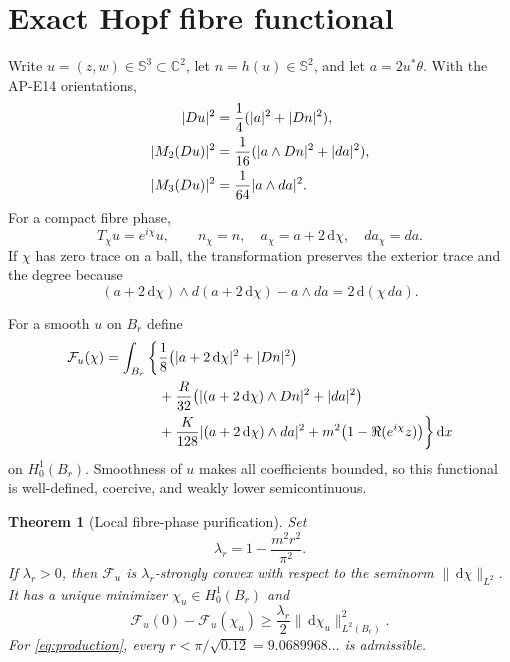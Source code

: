 \documentclass[11pt]{article}
\newtheorem{theorem}{Theorem}[section]
\newcommand{\dd}{\,\mathrm d}
\newcommand{\SSS}{\mathbb S}
\begin{document}
\section{Exact Hopf fibre functional}

Write $u=(z,w)\in\SSS^3\subset\mathbb C^2$, let $n=h(u)\in\SSS^2$, and let
$a=2u^*\theta$.  With the AP-E14 orientations,
\begin{align}
 |Du|^2&=\frac14(|a|^2+|Dn|^2),\notag\\
 |M_2(Du)|^2&=\frac1{16}(|a\wedge Dn|^2+|da|^2),\notag\\
 |M_3(Du)|^2&=\frac1{64}|a\wedge da|^2.              \label{eq:hopf}
\end{align}
For a compact fibre phase,
\begin{equation}
 T_\chi u=e^{i\chi}u,\qquad
 n_\chi=n,\quad a_\chi=a+2\dd\chi,\quad da_\chi=da.
 \label{eq:phase}
\end{equation}
If $\chi$ has zero trace on a ball, the transformation preserves the
exterior trace and the degree because
\begin{equation}
 (a+2\dd\chi)\wedge d(a+2\dd\chi)-a\wedge da
 =2\dd(\chi\,da).
 \label{eq:degree-invariance}
\end{equation}

For a smooth $u$ on $B_r$ define
\begin{align}
 \mathcal F_u(\chi)
 =\int_{B_r}\bigg\{&
 \frac18\bigl(|a+2\dd\chi|^2+|Dn|^2\bigr)\notag\\
 &+\frac R{32}\bigl(|(a+2\dd\chi)\wedge Dn|^2+|da|^2\bigr)\notag\\
 &+\frac K{128}|(a+2\dd\chi)\wedge da|^2
 +m^2\bigl(1-\Re(e^{i\chi}z)\bigr)\bigg\}\dd x
 \label{eq:phase-functional}
\end{align}
on $H^1_0(B_r)$.  Smoothness of $u$ makes all coefficients bounded, so this
functional is well-defined, coercive, and weakly lower semicontinuous.

\begin{theorem}[Local fibre-phase purification]
Set
\begin{equation}
 \lambda_r=1-\frac{m^2r^2}{\pi^2}.
 \label{eq:lambda}
\end{equation}
If $\lambda_r>0$, then $\mathcal F_u$ is
$\lambda_r$-strongly convex with respect to the seminorm
$\|\dd\chi\|_{L^2}$.  It has a unique minimizer $\chi_u\in H^1_0(B_r)$ and
\begin{equation}
 \mathcal F_u(0)-\mathcal F_u(\chi_u)
 \geq\frac{\lambda_r}{2}\|\dd\chi_u\|_{L^2(B_r)}^2.
 \label{eq:purification-gap}
\end{equation}
For \eqref{eq:production}, every $r<\pi/\sqrt{0.12}=9.0689968\ldots$ is
admissible.
\end{theorem}
\end{document}
